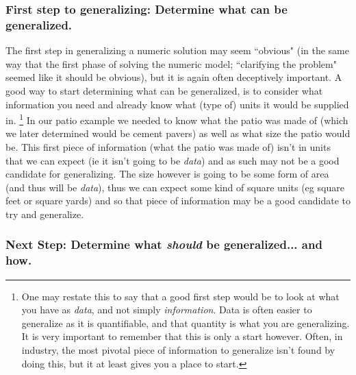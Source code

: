 \subsubsection*{First step to generalizing: Determine what can be generalized.}
The first step in generalizing a numeric solution may seem ``obvious" (in the same way that the first phase of solving the numeric model; ``clarifying the problem" seemed like it should be obvious), but it is again often deceptively important. A good way to start determining what can be generalized, is to consider what information you need and already know what (type of) units it would be supplied in.
\footnote{One may restate this to say that a good first step would be to look at what you have as \textit{data}, and not simply \textit{information}. Data is often easier to generalize as it is quantifiable, and that quantity is what you are generalizing. It is very important to remember that this is only a start however. Often, in industry, the most pivotal piece of information to generalize isn't found by doing this, but it at least gives you a place to start.}
In our patio example we needed to know what the patio was made of (which we later determined would be cement pavers) as well as what size the patio would be. This first piece of information (what the patio was made of) isn't in units that we can expect (ie it isn't going to be \textit{data}) and as such may not be a good candidate for generalizing. The size however is going to be some form of area (and thus will be \textit{data}), thus we can expect some kind of square units (eg square feet or square yards) and so that piece of information may be a good candidate to try and generalize.


\subsubsection*{Next Step: Determine what \emph{should} be generalized... and how.}

